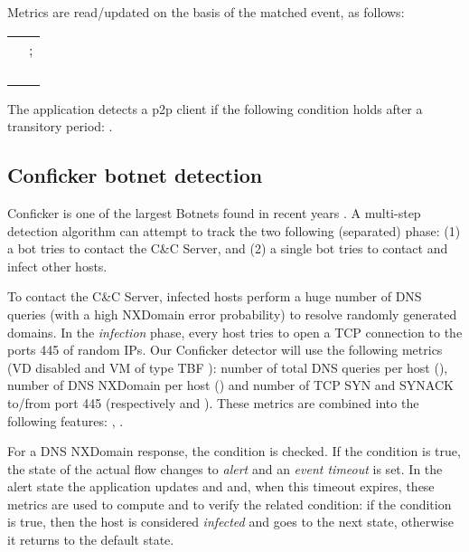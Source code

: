\documentclass[conference,letterpaper]{sig-alternate-10pt}
\begin{document}
Metrics are read/updated on the basis of the matched event, as follows:
\begin{center}
\begin{footnotesize}
\begin{tabular}{ | l | l | }
\hline
 &   \\
\hline
   		& ; \\
    	&  \\
    			&  \\
        		&  \\
				    		&  \\
				
\hline
\end{tabular}
\end{footnotesize}
\end{center}

The application detects a p2p client if the following condition holds after a transitory period: . 


\subsection{Conficker botnet detection}
\label{ss:use-conficker}
Conficker is one of the largest Botnets found in recent years \cite{torpig}. A multi-step detection algorithm can attempt to track the two following (separated) phase: (1) a bot tries to contact the C\&C Server, and (2) a  single bot tries to contact and infect other hosts.

To contact the C\&C Server, infected hosts perform a huge number of DNS queries (with a high NXDomain error probability) to resolve randomly generated domains. In the \emph{infection} phase, every host tries to open a TCP connection to the ports 445 of random IPs. Our Conficker detector will use the following metrics (VD disabled and VM of type TBF ): number of total DNS queries per host (), number of DNS NXDomain per host () and number of TCP SYN and SYNACK to/from port 445 (respectively  and ). These metrics are combined into the following features:  , . 

For a DNS NXDomain response, the condition  is checked. If the condition is true, the state of the actual flow changes to \emph{alert} and an \emph{event timeout} is set. In the alert state the application updates  and  and, when this timeout expires, these metrics are used to compute  and to verify the related condition: if the condition is true, then the host is considered \emph{infected} and goes to the next state, otherwise it returns to the default state.
\end{document}
